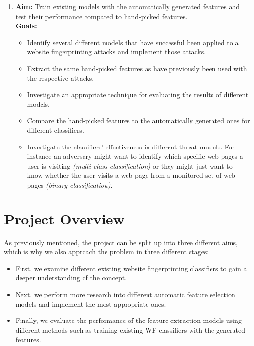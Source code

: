 \begin{enumerate}
   \item \textbf{Aim:} Train existing models with the automatically generated features and test their performance compared to hand-picked features.\\
   \textbf{Goals:}
   \begin{itemize}
      \item Identify several different models that have successful been applied to a website fingerprinting attacks and implement those attacks.
      \item Extract the same hand-picked features as have previously been used with the respective attacks.
      \item Investigate an appropriate technique for evaluating the results of different models.
      \item Compare the hand-picked features to the automatically generated ones for different classifiers.
      \item Investigate the classifiers' effectiveness in different threat models.
         For instance an adversary might want to identify which specific web pages a user is visiting \textit{(multi-class classification)} or
         they might just want to know whether the user visits a web page from a monitored set of web pages \textit{(binary classification)}.
   \end{itemize}

\end{enumerate}

\newpage

\section{Project Overview}
As previously mentioned, the project can be split up into three different aims, which is why we also approach the problem in three different stages:

\begin{itemize}
\item First, we examine different existing website fingerprinting classifiers to gain a deeper understanding of the concept.
\item Next, we perform more research into different automatic feature selection models and implement the most appropriate ones.
\item Finally, we evaluate the performance of the feature extraction models using different methods such as training existing WF classifiers with the generated features.
\end{itemize}



